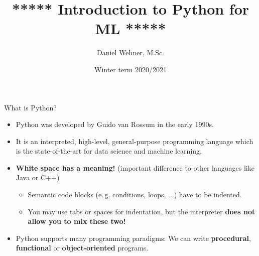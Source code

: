 



\newcommand{\code}[2][fill=lightgray!50]{%
	\tikz[baseline]\node[%
        	inner ysep=0.5pt, 
        	inner xsep=2pt, 
        	anchor=text, 
        	rectangle, 
        	rounded corners=1mm,
        	#1] {\strut \texttt{#2}};%
}


\title[Introduction to Python for ML]{***** Introduction to Python for ML *****}
\author{Daniel Wehner, M.Sc.}
\date{Winter term 2020/2021}




\dwPrintTitle

\dwPrintToc


\begin{dwHeaderFrame}{What is Python?}
	\begin{itemize}
		\item Python was developed by Guido van Rossum in the early 1990s.
		\item It is an interpreted, high-level, general-purpose programming language which is the state-of-the-art for data science and machine learning.
		\item \textbf{White space has a meaning!} (important difference to other languages like Java or C++)
		\begin{itemize}
			\item Semantic code blocks (e.\,g. conditions, loops, ...) have to be indented.
			\item You may use tabs or spaces for indentation, but the interpreter \textbf{does not allow you to mix these two!}
		\end{itemize}
		\item Python supports many programming paradigms: We can write \textbf{procedural}, \textbf{functional} or \textbf{object-oriented} programs.
	\end{itemize}
\end{dwHeaderFrame}


